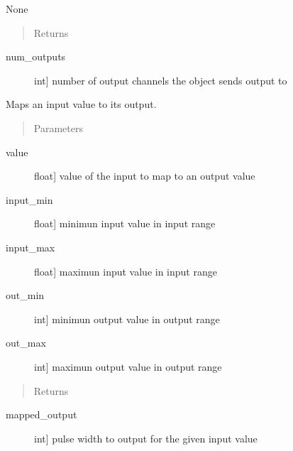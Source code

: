 \documentclass[letterpaper,10pt,english]{sphinxmanual}
\begin{document}
\begin{fulllineitems}
\begin{fulllineitems}
\sphinxAtStartPar
None
\begin{quote}\begin{description}
\item[{Returns}] \leavevmode
\end{description}\end{quote}
\begin{description}
\item[{num\_outputs}] \leavevmode{[}int{]}
\sphinxAtStartPar
number of output channels the object sends output to

\end{description}

\end{fulllineitems}


\begin{fulllineitems}
\label{\detokenize{base:OutputObject.OutputObject.map_values}}
\sphinxAtStartPar
Maps an input value to its output.
\begin{quote}\begin{description}
\item[{Parameters}] \leavevmode
\end{description}\end{quote}
\begin{description}
\item[{value}] \leavevmode{[}float{]}
\sphinxAtStartPar
value of the input to map to an output value

\item[{input\_min}] \leavevmode{[}float{]}
\sphinxAtStartPar
minimun input value in input range

\item[{input\_max}] \leavevmode{[}float{]}
\sphinxAtStartPar
maximun input value in input range

\item[{out\_min}] \leavevmode{[}int{]}
\sphinxAtStartPar
minimun output value in output range

\item[{out\_max}] \leavevmode{[}int{]}
\sphinxAtStartPar
maximun output value in output range

\end{description}
\begin{quote}\begin{description}
\item[{Returns}] \leavevmode
\end{description}\end{quote}
\begin{description}
\item[{mapped\_output}] \leavevmode{[}int{]}
\sphinxAtStartPar
pulse width to output for the given input value


\end{description}
\end{fulllineitems}
\end{fulllineitems}
\end{document}
